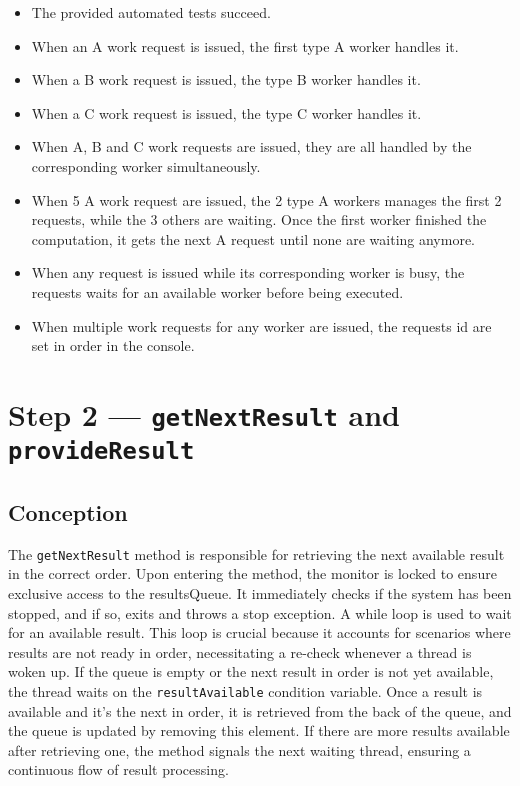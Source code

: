 \documentclass{article}
\begin{document}
    \begin{itemize}
        \item The provided automated tests succeed.
        \item When an A work request is issued, the first type A worker handles it.
        \item When a B work request is issued, the type B worker handles it.
        \item When a C work request is issued, the type C worker handles it.
        \item When A, B and C work requests are issued, they are all handled by the corresponding worker simultaneously.
        \item When 5 A work request are issued, the 2 type A workers manages the first 2 requests, while the 3 others are waiting. Once the first worker finished the computation, it gets the next A request until none are waiting anymore.
        \item When any request is issued while its corresponding worker is busy, the requests waits for an available worker before being executed.
        \item When multiple work requests for any worker are issued, the requests id are set in order in the console.
    \end{itemize}

    \pagebreak

    \section*{Step 2 --- \texttt{getNextResult} and \texttt{provideResult}}
    \subsection*{Conception}

    The \texttt{getNextResult} method is responsible for retrieving the next available result in the correct order.
    Upon entering the method, the monitor is locked to ensure exclusive access to the resultsQueue.
    It immediately checks if the system has been stopped, and if so, exits and throws a stop exception.
    A while loop is used to wait for an available result.
    This loop is crucial because it accounts for scenarios where results are not ready in order, necessitating a re-check whenever a thread is woken up.
    If the queue is empty or the next result in order is not yet available, the thread waits on the \texttt{resultAvailable} condition variable.
    Once a result is available and it's the next in order, it is retrieved from the back of the queue, and the queue is updated by removing this element.
    If there are more results available after retrieving one, the method signals the next waiting thread, ensuring a continuous flow of result processing.
\end{document}

